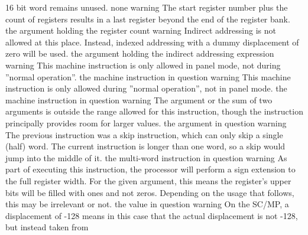 \documentclass[12pt,twoside]{report}
\begin{document}
\begin{description}
{                16 bit word remains unused.}
               {none}
               {warning}
               {The start register number plus the count of registers results
                in a last register beyond the end of the register bank.}
               {the argument holding the register count}
               {warning}
               {Indirect addressing is not allowed at this place.
                Instead, indexed addressing with a dummy displacement of
                zero will be used.}
               {the argument holding the indirect addressing expression}
               {warning}
               {This machine instruction is only allowed in panel mode,
                not during ''normal operation''.}
               {the machine instruction in question}
               {warning}
               {This machine instruction is only allowed during ''normal
                operation'', not in panel mode.}
               {the machine instruction in question}
               {warning}
               {The argument or the sum of two arguments is outside the
                range allowed for this instruction, though the instruction
                principally provides room for larger values.}
               {the argument in question}
               {warning}
               {The previous instruction was a skip instruction, which
                can only skip a single (half) word.  The current instruction
                is longer than one word, so a skip would jump into the middle
                of it.}
               {the multi-word instruction in question}
               {warning}
               {As part of executing this instruction, the processor will
                perform a sign extension to the full register width.  For the
                given argument, this means the register's upper bits will be
                filled with ones and not zeros.  Depending on the usage that
                follows, this may be irrelevant or not.}
               {the value in question}
               {warning}
               {On the SC/MP, a displacement of -128 means in this case that
                the actual displacement is not -128, but instead taken from
}
\end{description}
\end{document}
